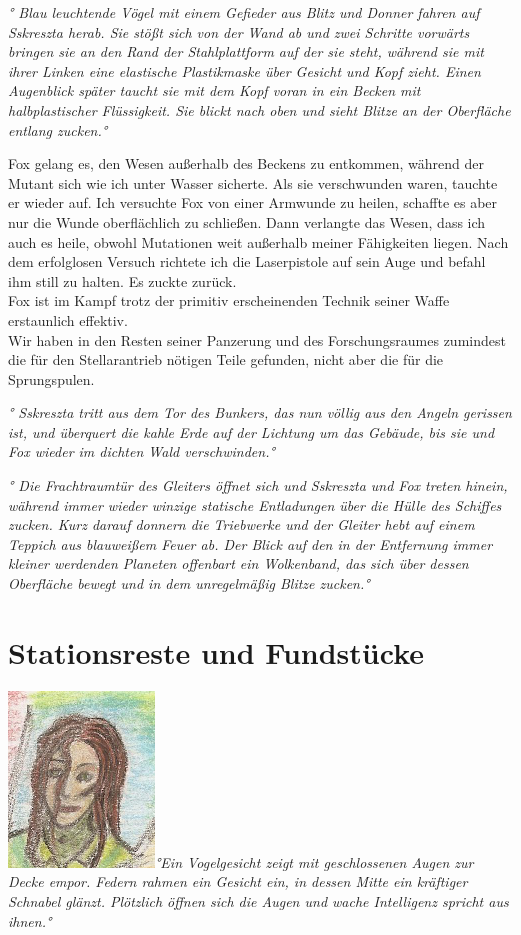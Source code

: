 \documentclass[11pt]{article}
\begin{document}
\emph{° Blau leuchtende Vögel mit einem Gefieder aus Blitz und Donner
fahren auf Sskreszta herab. Sie stößt sich von der Wand ab und zwei
Schritte vorwärts bringen sie an den Rand der Stahlplattform auf der sie
steht, während sie mit ihrer Linken eine elastische Plastikmaske über
Gesicht und Kopf zieht. Einen Augenblick später taucht sie mit dem Kopf
voran in ein Becken mit halbplastischer Flüssigkeit. Sie blickt nach
oben und sieht Blitze an der Oberfläche entlang zucken.°}

Fox gelang es, den Wesen außerhalb des Beckens zu entkommen, während der
Mutant sich wie ich unter Wasser sicherte. Als sie verschwunden waren,
tauchte er wieder auf. Ich versuchte Fox von einer Armwunde zu heilen,
schaffte es aber nur die Wunde oberflächlich zu schließen. Dann
verlangte das Wesen, dass ich auch es heile, obwohl Mutationen weit
außerhalb meiner Fähigkeiten liegen. Nach dem erfolglosen Versuch
richtete ich die Laserpistole auf sein Auge und befahl ihm still zu
halten. Es zuckte zurück.\\ Fox ist im Kampf trotz der primitiv
erscheinenden Technik seiner Waffe erstaunlich effektiv.\\ Wir haben in
den Resten seiner Panzerung und des Forschungsraumes zumindest die für
den Stellarantrieb nötigen Teile gefunden, nicht aber die für die
Sprungspulen.

\emph{° Sskreszta tritt aus dem Tor des Bunkers, das nun völlig aus den
Angeln gerissen ist, und überquert die kahle Erde auf der Lichtung um
das Gebäude, bis sie und Fox wieder im dichten Wald verschwinden.°}

\emph{° Die Frachtraumtür des Gleiters öffnet sich und Sskreszta und Fox
treten hinein, während immer wieder winzige statische Entladungen über
die Hülle des Schiffes zucken. Kurz darauf donnern die Triebwerke und
der Gleiter hebt auf einem Teppich aus blauweißem Feuer ab. Der Blick
auf den in der Entfernung immer kleiner werdenden Planeten offenbart ein
Wolkenband, das sich über dessen Oberfläche bewegt und in dem
unregelmäßig Blitze zucken.°}

\section{Stationsreste und Fundstücke}

\includegraphics{sskreszta-portrait-alt-klein.png}\emph{°Ein
Vogelgesicht zeigt mit geschlossenen Augen zur Decke empor. Federn
rahmen ein Gesicht ein, in dessen Mitte ein kräftiger Schnabel glänzt.
Plötzlich öffnen sich die Augen und wache Intelligenz spricht aus
ihnen.°}
\end{document}
